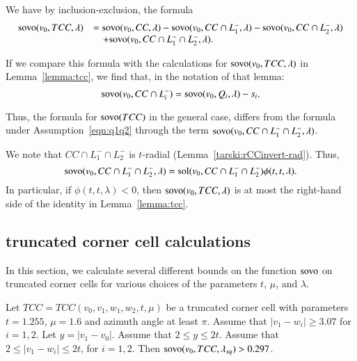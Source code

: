 We have by inclusion-exclusion, the formula
$$
\begin{array}{lll}
{\operatorname{sovo}}(v_0,TCC,\lambda) &=
{\operatorname{sovo}}(v_0,CC,\lambda) -
{\operatorname{sovo}}(v_0,CC\cap L_1^-,\lambda) -
{\operatorname{sovo}}(v_0,CC\cap L_2^-,\lambda) \\
 &\quad +
{\operatorname{sovo}}(v_0,CC\cap L_1^- \cap L_2^-,\lambda).
\end{array}
$$

If we compare this formula with the calculations for 
${\operatorname{sovo}}(v_0,TCC,\lambda)$ in Lemma~\ref{lemma:tcc}, 
we find that, in the notation of that lemma:
$$
{\operatorname{sovo}}(v_0,CC\cap L_i^-) = {\operatorname{sovo}}(v_0,Q_i,\lambda) - s_i.
$$

Thus, the formula for ${\operatorname{sovo}}(TCC)$ in the general case,
differs from the formula under Assumption~\ref{eqn:q1q2} through
the term ${\operatorname{sovo}}(v_0,CC\cap L_1^-\cap L_2^-,\lambda)$.

We note that $CC\cap L_1^-\cap L_2^-$ is $t$-radial 
(Lemma~\ref{tarski:rCCinvert-rad}).  Thus,
$$
{\operatorname{sovo}}(v_0,CC\cap L_1^-\cap L_2^-,\lambda) =
\operatorname{sol}(v_0,CC\cap L_1^-\cap L_2^-)\phi(t,t,\lambda).
$$
In particular, if $\phi(t,t,\lambda)<0$, then
${\operatorname{sovo}}(v_0,TCC,\lambda)$ is at most the right-hand side
of the identity in Lemma~\ref{lemma:tcc}.  




\subsection{truncated corner cell calculations}

In this section, we calculate several different bounds
on the function ${\operatorname{sovo}}$ on truncated corner cells for
various choices of the parameters $t$, $\mu$, and $\lambda$.

\begin{lemma} 
Let $TCC=TCC(v_0,v_1,w_1,w_2,t,\mu)$ 
be a truncated corner cell with
parameters $t=1.255$, $\mu=1.6$ and azimuth angle at least $\pi$. 
Assume that $|v_1-w_i|\ge 3.07$ for $i=1,2$.
Let $y=|v_1-v_0|$.  Assume that $2\le y\le 2t$.
Assume that $2\le |v_1-w_i|\le 2t$, for $i=1,2$.
Then ${\operatorname{sovo}}(v_0,TCC,\lambda_{sq}) > 0.297$.
\end{lemma}

